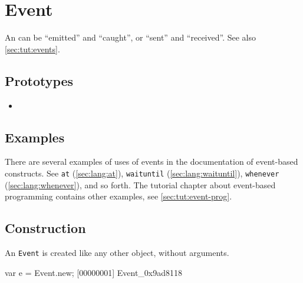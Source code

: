 \section{Event}

An  can be ``emitted'' and ``caught'', or ``sent'' and
``received''.  See also \autoref{sec:tut:events}.

\subsection{Prototypes}
\begin{itemize}
\item {}
\end{itemize}

\subsection{Examples}

There are several examples of uses of events in the documentation of
event-based constructs.  See \lstinline{at} (\autoref{sec:lang:at}),
\lstinline{waituntil} (\autoref{sec:lang:waituntil}),
\lstinline{whenever} (\autoref{sec:lang:whenever}), and so forth.  The
tutorial chapter about event-based programming contains other
examples, see \autoref{sec:tut:event-prog}.

\subsection{Construction}

An \lstinline{Event} is created like any other object, without
arguments.

\begin{urbiscript}[firstnumber=1]
var e = Event.new;
[00000001] Event_0x9ad8118
\end{urbiscript}

